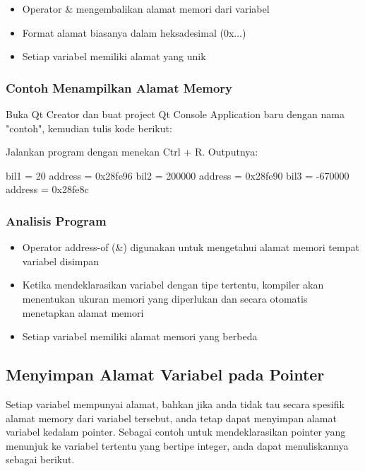 \begin{itemize}
\item Operator \& mengembalikan alamat memori dari variabel
\item Format alamat biasanya dalam heksadesimal (0x...)
\item Setiap variabel memiliki alamat yang unik
\end{itemize}

\subsubsection*{Contoh Menampilkan Alamat Memory}

Buka Qt Creator dan buat project Qt Console Application baru dengan nama "contoh", kemudian tulis kode berikut:



Jalankan program dengan menekan Ctrl + R. Outputnya:

\begin{lcverbatim}
bil1 = 20 address = 0x28fe96
bil2 = 200000 address = 0x28fe90
bil3 = -670000 address = 0x28fe8c
\end{lcverbatim}

\subsubsection*{Analisis Program}

\begin{itemize}
\item Operator address-of (\&) digunakan untuk mengetahui alamat memori tempat variabel disimpan
\item Ketika mendeklarasikan variabel dengan tipe tertentu, kompiler akan menentukan ukuran memori yang diperlukan dan secara otomatis menetapkan alamat memori
\item Setiap variabel memiliki alamat memori yang berbeda
\end{itemize}

\subsection{Menyimpan Alamat Variabel pada Pointer}\label{menyimpan-alamat-variabel-pada-pointer}

Setiap variabel mempunyai alamat, bahkan jika anda tidak tau secara
spesifik alamat memory dari variabel tersebut, anda tetap dapat
menyimpan alamat variabel kedalam pointer. Sebagai contoh untuk
mendeklarasikan pointer yang menunjuk ke variabel tertentu yang bertipe
integer, anda dapat menuliskannya sebagai berikut.

